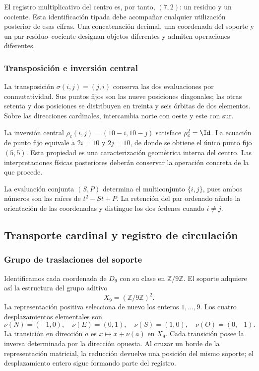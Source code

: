 El registro multiplicativo del centro es, por tanto, $(7,2)$: un residuo y un cociente. Esta identificación tipada debe acompañar cualquier utilización posterior de esas cifras. Una concatenación decimal, una coordenada del soporte y un par residuo--cociente designan objetos diferentes y admiten operaciones diferentes.

\subsubsection{Transposición e inversión central}

La transposición $\sigma(i,j)=(j,i)$ conserva las dos evaluaciones por conmutatividad. Sus puntos fijos son las nueve posiciones diagonales; las otras setenta y dos posiciones se distribuyen en treinta y seis órbitas de dos elementos. Sobre las direcciones cardinales, intercambia norte con oeste y este con sur.

La inversión central $\rho_c(i,j)=(10-i,10-j)$ satisface $\rho_c^2=\Id$. La ecuación de punto fijo equivale a $2i=10$ y $2j=10$, de donde se obtiene el único punto fijo $(5,5)$. Esta propiedad es una caracterización geométrica interna del centro. Las interpretaciones físicas posteriores deberán conservar la operación concreta de la que procede.

La evaluación conjunta $(S,P)$ determina el multiconjunto $\{i,j\}$, pues ambos números son las raíces de $t^2-St+P$. La retención del par ordenado añade la orientación de las coordenadas y distingue los dos órdenes cuando $i\neq j$.

\subsection{Transporte cardinal y registro de circulación}
\label{sec:app-transporte}

\subsubsection{Grupo de traslaciones del soporte}

Identificamos cada coordenada de $D_9$ con su clase en $\mathbb Z/9\mathbb Z$. El soporte adquiere así la estructura del grupo aditivo
\[
 X_9=(\mathbb Z/9\mathbb Z)^2.
\]
La representación positiva selecciona de nuevo los enteros $1,\ldots,9$. Los cuatro desplazamientos elementales son
\begin{equation}
 \nu(N)=(-1,0),\quad \nu(E)=(0,1),\quad
 \nu(S)=(1,0),\quad \nu(O)=(0,-1).
\end{equation}
La transición en dirección $a$ es $x\mapsto x+\nu(a)$ en $X_9$. Cada transición posee la inversa determinada por la dirección opuesta. Al cruzar un borde de la representación matricial, la reducción devuelve una posición del mismo soporte; el desplazamiento entero sigue formando parte del registro.

